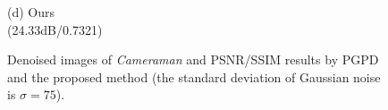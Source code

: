 \documentclass[runningheads]{llncs}
\begin{document}
\begin{figure}
{\begin{minipage}[t]{0.244\textwidth}
{\footnotesize (d) Ours \\(24.33dB/0.7321)}
\end{minipage}
}
\caption{Denoised images of \textsl{Cameraman} and PSNR/SSIM results by PGPD and the proposed method (the standard deviation of Gaussian noise is $\sigma=75$).}
\label{fig28}
\end{figure}

\begin{figure}
\centering
{}
\end{figure}
\end{document}
